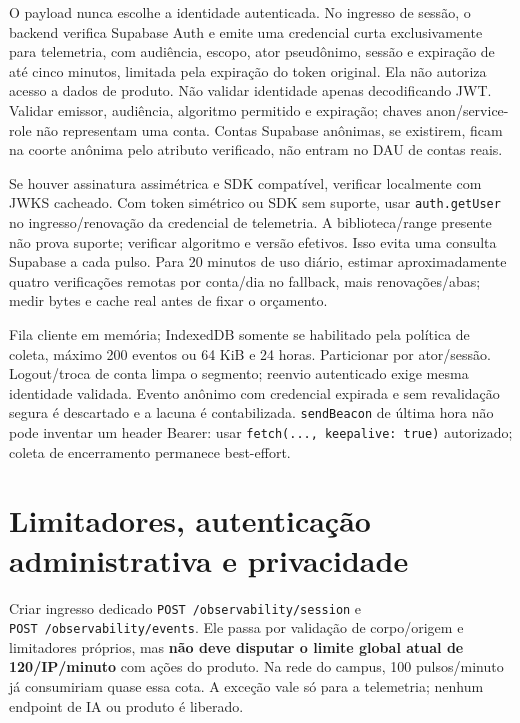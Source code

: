 \documentclass[10pt,a4paper]{article}
\begin{document}
O payload nunca escolhe a identidade autenticada. No ingresso de sessão,
o backend verifica Supabase Auth e emite uma credencial curta
exclusivamente para telemetria, com audiência, escopo, ator pseudônimo,
sessão e expiração de até cinco minutos, limitada pela expiração do
token original. Ela não autoriza acesso a dados de produto. Não validar
identidade apenas decodificando JWT. Validar emissor, audiência,
algoritmo permitido e expiração; chaves anon/service-role não
representam uma conta. Contas Supabase anônimas, se existirem, ficam na
coorte anônima pelo atributo verificado, não entram no DAU de contas
reais.

Se houver assinatura assimétrica e SDK compatível, verificar localmente
com JWKS cacheado. Com token simétrico ou SDK sem suporte, usar
{\footnotesize\ttfamily\nolinkurl{auth.getUser}} no ingresso/renovação da credencial de telemetria.
A biblioteca/range presente não prova suporte; verificar algoritmo e
versão efetivos. Isso evita uma consulta Supabase a cada pulso. Para 20
minutos de uso diário, estimar aproximadamente quatro verificações
remotas por conta/dia no fallback, mais renovações/abas; medir bytes e
cache real antes de fixar o orçamento.

Fila cliente em memória; IndexedDB somente se habilitado pela política
de coleta, máximo 200 eventos ou 64 KiB e 24 horas. Particionar por
ator/sessão. Logout/troca de conta limpa o segmento; reenvio autenticado
exige mesma identidade validada. Evento anônimo com credencial expirada
e sem revalidação segura é descartado e a lacuna é contabilizada.
{\footnotesize\ttfamily\nolinkurl{sendBeacon}} de última hora não pode inventar um header Bearer:
usar {\footnotesize\ttfamily\nolinkurl{fetch(...,}\ \nolinkurl{keepalive:}\ \nolinkurl{true)}} autorizado; coleta de
encerramento permanece best-effort.

\clearpage
\section{Limitadores, autenticação administrativa e
privacidade}\label{limitadores-autenticauxe7uxe3o-administrativa-e-privacidade}

Criar ingresso dedicado {\footnotesize\ttfamily\nolinkurl{POST}\ \nolinkurl{/observability/session}} e
{\footnotesize\ttfamily\nolinkurl{POST}\ \nolinkurl{/observability/events}}. Ele passa por validação de
corpo/origem e limitadores próprios, mas \textbf{não deve disputar o
limite global atual de 120/IP/minuto} com ações do produto. Na rede do
campus, 100 pulsos/minuto já consumiriam quase essa cota. A exceção vale
só para a telemetria; nenhum endpoint de IA ou produto é liberado.
\end{document}
